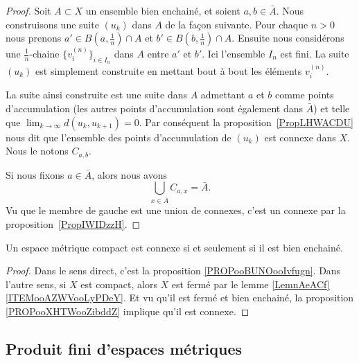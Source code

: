 \begin{proof}
    Soit \( A\subset X\) un ensemble bien enchainé, et soient \( a,b\in \bar A\). Nous construisons une suite \( (u_k)\) dans \( A\) de la façon suivante. Pour chaque \( n>0\) nous prenons \( a'\in B(a,\frac{1}{ n })\cap A\) et \( b'\in B(b,\frac{1}{ n })\cap A\). Ensuite nous considérons une \( \frac{1}{ n }\)-chaine \( \{ v_i^{(n)} \}_{i\in I_n}\) dans \( A\) entre \( a'\) et \( b'\). Ici l'ensemble \( I_n\) est fini. La suite \( (u_k)\) est simplement construite en mettant bout à bout les éléments \( v_i^{(n)}\).

    La suite ainsi construite est une suite dans \( A\) admettant \( a\) et \( b\) comme points d'accumulation (les autres points d'accumulation sont également dans \( \bar A\)) et telle que \( \lim_{k\to \infty} d(u_k,u_{k+1})=0\). Par conséquent la proposition~\ref{PropLHWACDU} nous dit que l'ensemble des points d'accumulation de \( (u_k)\) est connexe dans \( X\). Nous le notons \( C_{a,b}\).

    Si nous fixons \( a\in \bar A\), alors nous avons
    \begin{equation}
        \bigcup_{x\in \bar A}C_{a,x}=\bar A.
    \end{equation}
    Vu que le membre de gauche est une union de connexes, c'est un connexe par la proposition~\ref{PropIWIDzzH}.
\end{proof}

\begin{corollary}       \label{CORooSIKCooTncoQm}
    Un espace métrique compact est connexe si et seulement si il est bien enchainé.
\end{corollary}

\begin{proof}
    Dans le sens direct, c'est la proposition \ref{PROPooBUNOooIvfugn}. Dans l'autre sens, si \( X\) est compact, alors \( X\) est fermé par le lemme \ref{LemnAeACf}\ref{ITEMooAZWVooLyPDeY}. Et vu qu'il est fermé et bien enchainé, la proposition \ref{PROPooXHTWooZibddZ} implique qu'il est connexe.
\end{proof}

\subsection{Produit fini d'espaces métriques}

